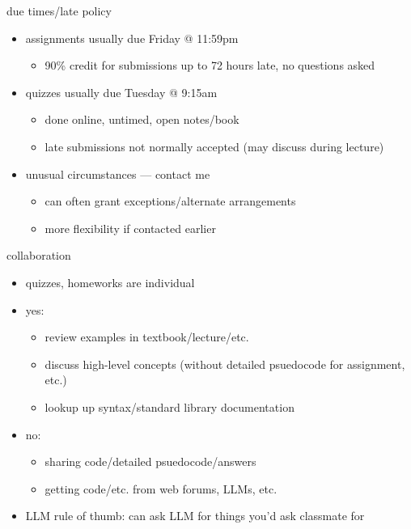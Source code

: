 \begin{frame}{due times/late policy}
    \begin{itemize}
    \item assignments usually due Friday @ 11:59pm
        \begin{itemize}
        \item 90\% credit for submissions up to 72 hours late, no questions asked
        \end{itemize}
    \item quizzes usually due Tuesday @ 9:15am
        \begin{itemize}
        \item done online, untimed, open notes/book
        \item late submissions not normally accepted (may discuss during lecture)
        \end{itemize}
    \vspace{.5cm}
    \item unusual circumstances --- contact me
        \begin{itemize}
        \item can often grant exceptions/alternate arrangements
        \item more flexibility if contacted earlier
        \end{itemize}
    \end{itemize}
\end{frame}

\begin{frame}{collaboration}
    \begin{itemize}
    \item quizzes, homeworks are individual
    \vspace{.5cm}
    \item yes:
        \begin{itemize}
        \item review examples in textbook/lecture/etc.
        \item discuss high-level concepts (without detailed psuedocode for assignment, etc.)
        \item lookup up syntax/standard library documentation
        \end{itemize}
    \item no:
        \begin{itemize}
        \item sharing code/detailed psuedocode/answers
        \item getting code/etc. from web forums, LLMs, etc.
        \end{itemize}
    \item LLM rule of thumb: can ask LLM for things you'd ask classmate for
    \end{itemize}
\end{frame}

